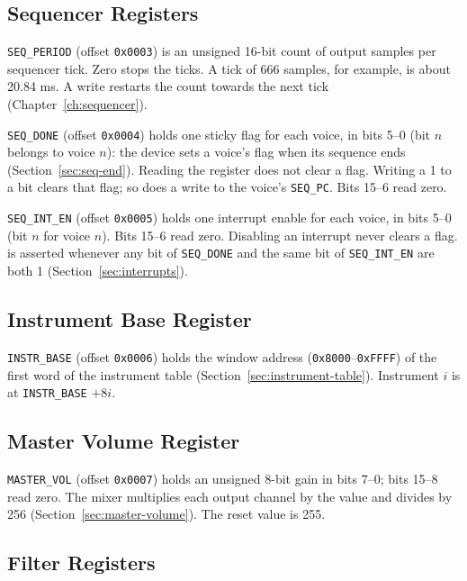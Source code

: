 \subsection{Sequencer Registers}
\label{sec:reg-sequencer}

\texttt{SEQ\_PERIOD} (offset \texttt{0x0003}) is an unsigned 16-bit count of output samples per sequencer tick.
Zero stops the ticks. A tick of 666 samples, for example, is about 20.84 ms. A write restarts the count towards the
next tick (Chapter~\ref{ch:sequencer}).

\texttt{SEQ\_DONE} (offset \texttt{0x0004}) holds one sticky flag for each voice, in bits 5--0 (bit $n$ belongs to voice $n$): the device sets a voice's
flag when its sequence ends (Section~\ref{sec:seq-end}). Reading the register does not clear a flag. Writing a 1 to a
bit clears that flag; so does a write to the voice's \texttt{SEQ\_PC}. Bits 15--6 read zero.

\texttt{SEQ\_INT\_EN} (offset \texttt{0x0005}) holds one interrupt enable for each voice, in bits 5--0 (bit $n$ for voice $n$). Bits 15--6 read
zero. Disabling an interrupt never clears a flag.  is asserted whenever any bit of
\texttt{SEQ\_DONE} and the same bit of \texttt{SEQ\_INT\_EN} are both 1 (Section~\ref{sec:interrupts}).

\subsection{Instrument Base Register}

\texttt{INSTR\_BASE} (offset \texttt{0x0006}) holds the window address (\texttt{0x8000}--\texttt{0xFFFF}) of the first word
of the instrument table (Section~\ref{sec:instrument-table}). Instrument $i$ is at \texttt{INSTR\_BASE} $+ 8i$.

\subsection{Master Volume Register}

\texttt{MASTER\_VOL} (offset \texttt{0x0007}) holds an unsigned 8-bit gain in bits 7--0; bits 15--8 read zero. The mixer
multiplies each output channel by the value and divides by 256 (Section~\ref{sec:master-volume}). The reset value is
255.

\subsection{Filter Registers}
\label{sec:reg-filter}

